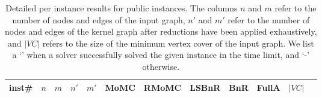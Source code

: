 \documentclass[twoside,leqno,twocolumn]{article}
\newcommand{\AlgName}[1]{\textsf{#1}}
\begin{document}


\vfill
\begin{table}
\centering
\caption{Detailed per instance results for public instances. The columns $n$ and $m$ refer to the number of nodes and edges of the input graph, $n'$ and $m'$ refer to the number of nodes and edges of the kernel graph after reductions have been applied exhaustively, and $|VC|$ refers to the size of the minimum vertex cover of the input graph. We list a `\checkmark' when a solver successfully solved the given instance in the time limit, and `-' otherwise.}
\label{tab:detailedresults1}
\begin{tabular}{l@{\hskip 25pt} rrrr|ccccc|rc}
\toprule
inst\# & $n$ &$m$& $n'$& $m'$ & \AlgName{MoMC} & \AlgName{RMoMC} & \AlgName{LSBnR} & \AlgName{BnR} & \AlgName{FullA} & $|VC|$ \\
                \midrule


\end{tabular}
\end{table}
\end{document}
